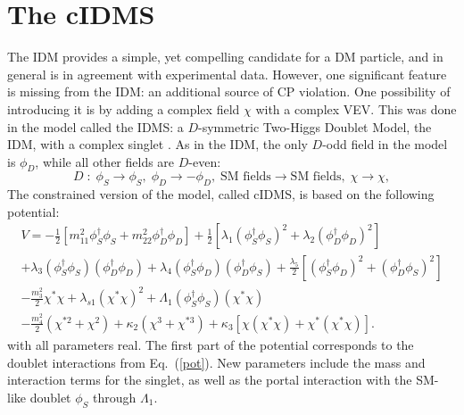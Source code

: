 \documentclass{PoS}
\newcommand{\htb}[1]{{\color{blue} #1}}
\begin{document}
{%

\section{The cIDMS}
The IDM provides a simple, yet compelling candidate for a DM particle, and in general is in agreement with experimental data. However, one significant feature is missing from the IDM: an additional source of CP violation. One possibility of introducing it is by adding a complex field $\chi$ with a complex VEV. This was done in the model called the IDMS: a $D$-symmetric Two-Higgs Doublet Model, the IDM, with a complex singlet \cite{Bonilla:2014xba}. 
As in the IDM, the only $D$-odd field in the model is $\phi_D$, while all other fields are $D$-even:
\begin{equation}
D\;:\; \phi_S \to \phi_S, \;  \phi_D \to - \phi_D, \; \textrm{SM fields} \to  \textrm{SM fields}, \; \chi \to \chi, \label{z2}
\end{equation}
The {constrained version of the model, called  cIDMS, is based on the following  potential}:
\begin{equation} 
    \begin{array}{c}
V = -\frac{1}{2}\left[{m_{11}^2} \phi_S^\dagger\phi_S + {m_{22}^2} \phi_D^\dagger\phi_D \right] 
+ \frac{1}{2}\left[\lambda_1 \left(\phi_S^\dagger\phi_S\right)^2 
+ \lambda_2 \left(\phi_D^\dagger\phi_D \right)^2\right]\\[6mm]
+  \lambda_3 \left(\phi_S^\dagger\phi_S \right) \left(\phi_D^\dagger\phi_D\right) + \lambda_4 
\left(\phi_S^\dagger\phi_D\right) \left(\phi_D^\dagger\phi_S\right) +\frac{\lambda_5}{2}\left[\left(\phi_S^\dagger\phi_D\right)^2\!
+\!\left(\phi_D^\dagger\phi_S\right)^2\right] \\[3mm]
-\frac{m_3^2}{2} \chi^* \chi + \lambda_{s1} (\chi^*\chi)^2 + \Lambda_1(\phi_S^\dagger\phi_S)(\chi^* \chi)\\[2mm]
 -\frac{m_4^2}{2} (\chi^{*2} + \chi^2) + \kappa_2 (\chi^3 + \chi^{*3}) + \kappa_3 [ \chi(\chi^*\chi) + \chi^*(\chi^*\chi)].
    \end{array}
\label{potIDM1S}
\end{equation}
with all parameters real. The first part of the potential corresponds to the doublet interactions from Eq.~(\ref{pot}). New parameters include the mass and interaction terms for the singlet, as well as the portal interaction with the SM-like doublet $\phi_S$ through $\Lambda_1$. 

}
\end{document}
